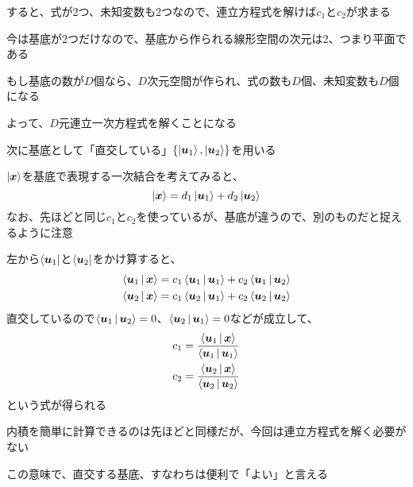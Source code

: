 \documentclass[../book_half_step_linear]{subfiles}
\begin{document}
すると、式が2つ、未知変数も2つなので、連立方程式を解けば$c_1$と$c_2$が求まる

\br

今は基底が2つだけなので、基底から作られる線形空間の次元は2、つまり平面である

もし基底の数が$D$個なら、$D$次元空間が作られ、式の数も$D$個、未知変数も$D$個になる

よって、$D$元連立一次方程式を解くことになる

\sectionline

次に基底として「直交している」$\left\{ \ket{\vb*{u}_1}, \ket{\vb*{u}_2} \right\}$を用いる

$\ket{\vb*{x}}$を基底で表現する一次結合を考えてみると、
\begin{equation*}
  \ket{\vb*{x}} = d_1 \ket{\vb*{u}_1} + d_2 \ket{\vb*{u}_2}
\end{equation*}
なお、先ほどと同じ$c_1$と$c_2$を使っているが、基底が違うので、別のものだと捉えるように注意

\br

左から$\bra{\vb*{u}_1}$と$\bra{\vb*{u}_2}$をかけ算すると、
\begin{align*}
  \Braket{\vb*{u}_1|\vb*{x}} & = c_1 \Braket{\vb*{u}_1|\vb*{u}_1} + c_2 \Braket{\vb*{u}_1|\vb*{u}_2} \\
  \Braket{\vb*{u}_2|\vb*{x}} & = c_1 \Braket{\vb*{u}_2|\vb*{u}_1} + c_2 \Braket{\vb*{u}_2|\vb*{u}_2}
\end{align*}
直交しているので$\Braket{\vb*{u}_1|\vb*{u}_2} = 0$、$\Braket{\vb*{u}_2|\vb*{u}_1} = 0$などが成立して、
\begin{align*}
  c_1 & = \frac{\Braket{\vb*{u}_1|\vb*{x}}}{\Braket{\vb*{u}_1|\vb*{u}_1}} \\
  c_2 & = \frac{\Braket{\vb*{u}_2|\vb*{x}}}{\Braket{\vb*{u}_2|\vb*{u}_2}}
\end{align*}
という式が得られる

内積を簡単に計算できるのは先ほどと同様だが、今回は連立方程式を解く必要がない

この意味で、直交する基底、すなわちは便利で「よい」と言える
\end{document}
